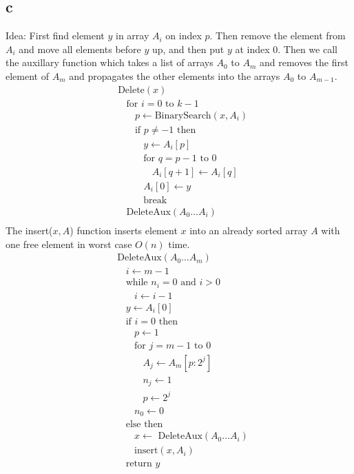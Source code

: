\documentclass[koma,a4paper]{article}
\begin{document}
\subsection{c}
Idea: First find element $y$ in array $A_i$ on index $p$. Then remove the element from $A_i$ and move all elements before $y$ up, and then put $y$ at index 0. Then we call the auxillary function which takes a list of arrays $A_0$ to $A_m$ and removes the first element of $A_m$ and propagates the other elements into the arrays $A_0$ to $A_{m-1}$.
\begin{align*}
  &\text{Delete}(x)\\
  &~~~~\text{for } i=0 \text{ to } k-1\\
  &~~~~~~~~p \leftarrow \text{BinarySearch}(x, A_i)\\
  &~~~~~~~~\text{if } p \neq -1 \text{ then}\\
  &~~~~~~~~~~~~y \leftarrow A_i[p]\\
  &~~~~~~~~~~~~\text{for } q=p-1 \text{ to } 0\\
  &~~~~~~~~~~~~~~~~A_i[q+1] \leftarrow A_i[q]\\
  &~~~~~~~~~~~~A_i[0] \leftarrow y\\
  &~~~~~~~~~~~~\text{break}\\
  &~~~~\text{DeleteAux}(A_0\ldots A_i)\\
\end{align*}
The insert($x, A$) function inserts element $x$ into an already sorted array $A$ with one free element in worst case $O(n)$ time.
\begin{align*}
  &\text{DeleteAux}(A_0\ldots A_m)\\
  &~~~~i \leftarrow m-1\\
  &~~~~\text{while } n_i = 0 \text{ and } i > 0\\
  &~~~~~~~~i \leftarrow i - 1\\
  &~~~~y \leftarrow A_i[0]\\
  &~~~~\text{if } i = 0 \text{ then}\\
  &~~~~~~~~p \leftarrow 1\\
  &~~~~~~~~\text{for } j=m-1 \text{ to } 0\\
  &~~~~~~~~~~~~A_j \leftarrow A_m[p:2^j]\\
  &~~~~~~~~~~~~n_j \leftarrow 1\\
  &~~~~~~~~~~~~p \leftarrow 2^j\\
  &~~~~~~~~n_0 \leftarrow 0\\
  &~~~~\text{else then}\\
  &~~~~~~~~x \leftarrow \text{ DeleteAux}(A_0\ldots A_i)\\
  &~~~~~~~~\text{insert}(x, A_i)\\
  &~~~~\text{return } y\\
\end{align*}
\end{document}
